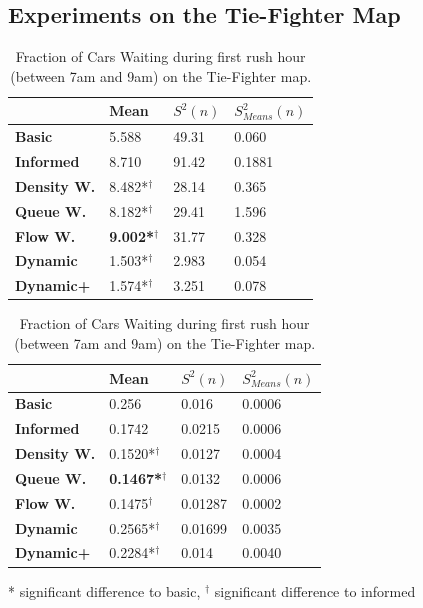 \documentclass[11pt]{article}
\begin{document}
\subsection{Experiments on the Tie-Fighter Map}
\begin{table}[t]
\centering
\caption{Average Velocity of Cars during first rush hour (between 7am and 9am) on the Tie-Fighter map.}
\label{tab:velo-morning-tie}
\begin{tabular}{l|l|l|l|}
\textbf{}                 & \textbf{Mean} & \textbf{$S^2(n)$} & \textbf{$S_{Means}^2(n)$} \\
\hline\textbf{Basic}            & 5.588          & 49.31             & 0.060                      \\
\textbf{Informed}         & 8.710          & 91.42             & 0.1881                     \\
\hline\textbf{Density W.} & 8.482*$^\dagger$          & 28.14             & 0.365                      \\
\textbf{Queue W.}   & 8.182*$^\dagger$          & 29.41             & 1.596                      \\
\textbf{Flow W.}    & \textbf{9.002*$^\dagger$} & 31.77             & 0.328                      \\
\textbf{Dynamic}          & 1.503*$^\dagger$          & 2.983             & 0.054                      \\
\textbf{Dynamic+}         & 1.574*$^\dagger$          & 3.251             & 0.078                   
\end{tabular}
\vspace{20pt}
\centering
\caption{Fraction of Cars Waiting during first rush hour (between 7am and 9am) on the Tie-Fighter map.}
\label{tab:waiting-morning-tie}
\begin{tabular}{l|l|l|l|}
\textbf{}                 & \textbf{Mean} & \textbf{$S^2(n)$} & \textbf{$S_{Means}^2(n)$} \\
\hline\textbf{Basic}      & 0.256           & 0.016             & 0.0006                     \\
\textbf{Informed}   & 0.1742          & 0.0215            & 0.0006                     \\
\hline\textbf{Density W.} & 0.1520*$^\dagger$          & 0.0127            & 0.0004                     \\
\textbf{Queue W.}   & \textbf{0.1467*$^\dagger$} & 0.0132            & 0.0006                     \\
\textbf{Flow W.}    & 0.1475$^\dagger$          & 0.01287           & 0.0002                     \\
\textbf{Dynamic}    & 0.2565*$^\dagger$          & 0.01699           & 0.0035                     \\
\textbf{Dynamic+}   & 0.2284*$^\dagger$          & 0.014             & 0.0040                    
\end{tabular}

\small{* significant difference to basic, $^\dagger$ significant difference to informed}
\end{table}
\end{document}
